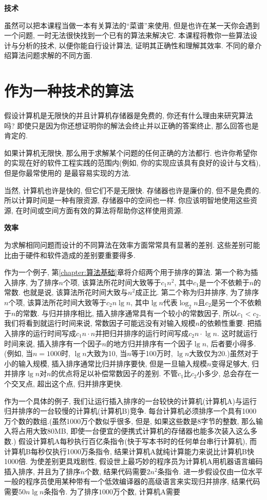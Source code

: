 \documentclass[oneside,10pt,fontset=none]{ctexbook}
\numberwithin{definition}{chapter}
\numberwithin{theorem}{chapter}
\numberwithin{lemma}{chapter}
\begin{document}
\textbf{技术}

虽然可以把本课程当做一本有关算法的``菜谱''来使用, 但是也许在某一天你会遇到一个问题, 一时无法很快找到一个已有的算法来解决它. 本课程将教你一些算法设计与分析的技术, 以便你能自行设计算法, 证明其正确性和理解其效率. 不同的章介绍算法问题求解的不同方面.

\section{作为一种技术的算法}

假设计算机是无限快的并且计算机存储器是免费的, 你还有什么理由来研究算法吗? 即使只是因为你还想证明你的解法会终止并以正确的答案终止, 那么回答也是肯定的.

如果计算机无限快, 那么用于求解某个问题的任何正确的方法都行. 也许你希望你的实现在好的软件工程实践的范围内(例如, 你的实现应该具有良好的设计与文档), 但是你最常使用的
是最容易实现的方法.

当然, 计算机也许是快的, 但它们不是无限快. 存储器也许是廉价的, 但不是免费的. 所以计算时间是一种有限资源, 存储器中的空间也一样. 你应该明智地使用这些资源, 在时间或空间方面有效的算法将帮助你这样使用资源.

\textbf{效率}

为求解相同问题而设计的不同算法在效率方面常常具有显著的差别. 这些差别可能比由于硬件和软件造成的差别要重要得多.

作为一个例子, 第\ref{chapter:算法基础}章将介绍两个用于排序的算法. 第一个称为插入排序, 为了排序$n$个项, 该算法所花时间大致等于$c_1n^2$, 其中$c_1$是一个不依赖于$n$的常数. 也就是说, 该算法所花时间大致与$n^2$成正比. 第二个称为归并排序, 为了排序$n$个项, 该算法所花时间大致等于$c_2n\lg{n}$, 其中$\lg{n}$代表$\log_2n$且$c_2$是另一个不依赖于$n$的常数. 与归并排序相比, 插入排序通常具有一个较小的常数因子, 所以$c_1<c_2$. 我们将看到就运行时间来说, 常数因子可能远没有对输入规模$n$的依赖性重要. 把插入排序的运行时间写成$c_1n\cdot n$并把归并排序的运行时间写成$c_2n\cdot \lg{n}$. 这时就运行时间来说, 插入排序有一个因子$n$的地方归并排序有一个因子$\lg{n}$, 后者要小得多. (例如, 当$n=1000$时, $\lg{n}$大致为10, 当$n$等于100万时, $\lg{n}$大致仅为20.)虽然对于小的输入规模, 插入排序通常比归并排序要快, 但是一旦输入规模$n$变得足够大, 归并排序$\lg{n}$对$n$的优点将足以补偿常数因子的差别. 不管$c_1$比$c_2$小多少, 总会存在一个交叉点, 超出这个点, 归并排序更快.

作为一个具体的例子, 我们让运行插入排序的一台较快的计算机(计算机A)与运行归并排序的一台较慢的计算机(计算机B)竞争. 每台计算机必须排序一个具有1000万个数的数组.(虽然1000万个数似乎很多, 但是, 如果这些数是8字节的整数, 那么输入将占用大致80MB, 即使一台便宜的便携式计算机的存储器也能多次装入这么多数.) 假设计算机A每秒执行百亿条指令(快于写本书时的任何单台串行计算机), 而计算机B每秒仅执行1000万条指令, 结果计算机A就纯计算能力来说比计算机B快1000倍. 为使差别更具戏剧性, 假设世上最巧妙的程序员为计算机A用机器语言编码插入排序, 并且为了排序$n$个数, 结果代码需要$2n^2$条指令. 进一步假设仅由一位水平一般的程序员使用某种带有一个低效编译器的高级语言来实现归并排序, 结果代码需要$50n\lg{n}$条指令. 为了排序$1000$万个数, 计算机A需要
\end{document}
